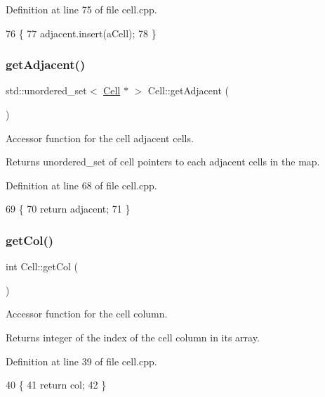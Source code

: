 Definition at line 75 of file cell.\+cpp.


\begin{DoxyCode}
76 \{
77     adjacent.insert(aCell);
78 \}
\end{DoxyCode}
\hypertarget{class_cell_a9912ab381441093706286584eff721fa}{}\label{class_cell_a9912ab381441093706286584eff721fa} 
\subsubsection{\texorpdfstring{get\+Adjacent()}{getAdjacent()}}
{\footnotesize\ttfamily std\+::unordered\+\_\+set$<$ \hyperlink{class_cell}{Cell} $\ast$ $>$ Cell\+::get\+Adjacent (\begin{DoxyParamCaption}{ }\end{DoxyParamCaption})}

Accessor function for the cell adjacent cells. \begin{DoxyReturn}{Returns}
unordered\+\_\+set of cell pointers to each adjacent cells in the map. 
\end{DoxyReturn}


Definition at line 68 of file cell.\+cpp.


\begin{DoxyCode}
69 \{
70     \textcolor{keywordflow}{return} adjacent;
71 \}
\end{DoxyCode}
\hypertarget{class_cell_ace419ef9ac6690bab2dd554d8b9f0d2f}{}\label{class_cell_ace419ef9ac6690bab2dd554d8b9f0d2f} 
\subsubsection{\texorpdfstring{get\+Col()}{getCol()}}
{\footnotesize\ttfamily int Cell\+::get\+Col (\begin{DoxyParamCaption}{ }\end{DoxyParamCaption})}

Accessor function for the cell column. \begin{DoxyReturn}{Returns}
integer of the index of the cell column in its array. 
\end{DoxyReturn}


Definition at line 39 of file cell.\+cpp.


\begin{DoxyCode}
40 \{
41     \textcolor{keywordflow}{return} col;
42 \}
\end{DoxyCode}
\hypertarget{class_cell_a6665d7f040a6a7b140e8d27c608a421e}{}\label{class_cell_a6665d7f040a6a7b140e8d27c608a421e} 
